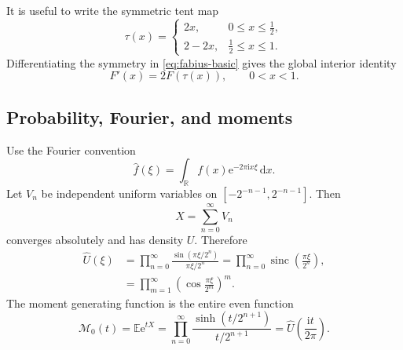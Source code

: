 \documentclass[11pt,oneside]{article}
\theoremstyle{definition}
\theoremstyle{remark}
\newcommand{\R}{\mathbb R}
\newcommand{\E}{\mathbb E}
\newcommand{\e}{\mathrm e}
\newcommand{\ii}{\mathrm i}
\newcommand{\dd}{\,\mathrm d}
\newcommand{\M}{\mathcal M}
\DeclareMathOperator{\sinc}{sinc}
\begin{document}
It is useful to write the symmetric tent map
\begin{equation}
 \tau(x)=
 \begin{cases}
  2x,&0\le x\le\frac12,\\
  2-2x,&\frac12\le x\le1.
 \end{cases}
 \label{eq:tent}
\end{equation}
Differentiating the symmetry in \eqref{eq:fabius-basic} gives the global interior identity
\begin{equation}
 F'(x)=2F(\tau(x)),\qquad 0<x<1.
 \label{eq:tent-derivative}
\end{equation}

\subsection{Probability, Fourier, and moments}
Use the Fourier convention
\begin{equation}
 \widehat f(\xi)=\int_{\R}f(x)\e^{-2\pi\ii x\xi}\dd x.
 \label{eq:fourier-convention}
\end{equation}
Let $V_n$ be independent uniform variables on
$[-2^{-n-1},2^{-n-1}]$.  Then
\begin{equation}
 X=\sum_{n=0}^{\infty}V_n
 \label{eq:random-series}
\end{equation}
converges absolutely and has density $U$.  Therefore
\begin{align}
 \widehat U(\xi)
 &=\prod_{n=0}^{\infty}
   \frac{\sin(\pi\xi/2^n)}{\pi\xi/2^n}
  =\prod_{n=0}^{\infty}\sinc\!\left(\frac{\pi\xi}{2^n}\right),
 \label{eq:sinc-product}\\
 &=\prod_{m=1}^{\infty}
   \left(\cos\frac{\pi\xi}{2^m}\right)^m.
 \label{eq:cos-product}
\end{align}
The moment generating function is the entire even function
\begin{equation}
 \M_0(t)=\E\e^{tX}
 =\prod_{n=0}^{\infty}
   \frac{\sinh(t/2^{n+1})}{t/2^{n+1}}
 =\widehat U\!\left(\frac{\ii t}{2\pi}\right).
 \label{eq:mgf}
\end{equation}
\end{document}
